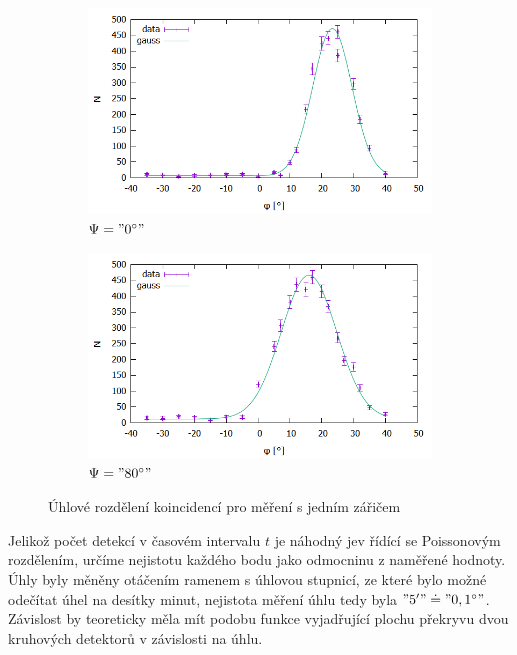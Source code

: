 \documentclass[10pt,a4paper]{article}
\begin{document}
\begin{figure}[h]
\centering
\begin{subfigure}{0.5\textwidth}
\includegraphics[width=\textwidth]{jeden0.png}
\caption{$\Psi="0^\circ"$}
\label{jeden0}
\end{subfigure}\begin{subfigure}{0.5\textwidth}
\centering
\includegraphics[width=\textwidth]{jeden80.png}
\caption{$\Psi="80^\circ"$}
\label{jeden80}
\end{subfigure}
\caption{Úhlové rozdělení koincidencí pro měření s jedním zářičem}
\label{jeden}
\end{figure}
Jelikož počet detekcí v časovém intervalu $t$ je náhodný jev řídící se Poissonovým rozdělením, určíme nejistotu každého bodu jako odmocninu z naměřené hodnoty. %
Úhly byly měněny otáčením ramenem s úhlovou stupnicí, ze které bylo možné odečítat úhel na desítky minut, nejistota měření úhlu tedy byla $"5'"\doteq"0,1^\circ"$. 
Závislost by teoreticky měla mít podobu funkce vyjadřující plochu překryvu dvou kruhových detektorů v závislosti na úhlu. %
\end{document}
